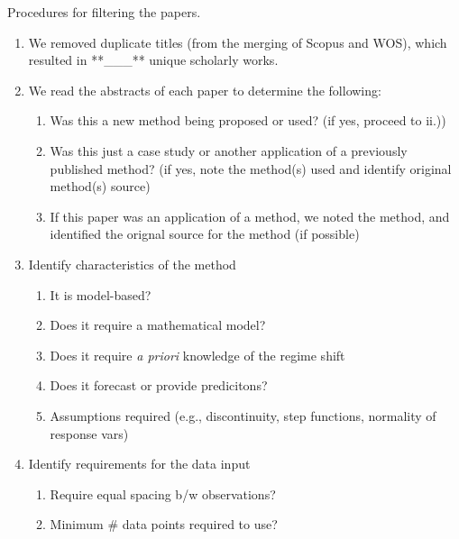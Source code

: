 \documentclass[12pt,twoside]{reedthesis}
\providecommand{\tightlist}{%
  \setlength{\itemsep}{0pt}\setlength{\parskip}{0pt}}
\begin{document}
\begin{enumerate}
  Procedures for filtering the papers.
  \begin{enumerate}
  \def\labelenumii{\roman{enumii}.}
  \tightlist
  \item
    We removed duplicate titles (from the merging of Scopus and WOS),
    which resulted in **\_\_\_** unique scholarly works.\\
  \item
    We read the abstracts of each paper to determine the following:
    \begin{enumerate}
    \def\labelenumiii{\alph{enumiii}.}
    \tightlist
    \item
      Was this a new method being proposed or used? (if yes, proceed to
      ii.))\\
    \item
      Was this just a case study or another application of a previously
      published method? (if yes, note the method(s) used and identify
      original method(s) source)\\
    \item
      If this paper was an application of a method, we noted the method,
      and identified the orignal source for the method (if possible)\\
    \end{enumerate}
  \item
    Identify characteristics of the method
    \begin{enumerate}
    \def\labelenumiii{\alph{enumiii}.}
    \setcounter{enumiii}{2}
    \tightlist
    \item
      It is model-based?\\
    \item
      Does it require a mathematical model?
    \item
      Does it require \emph{a priori} knowledge of the regime shift
    \item
      Does it forecast or provide predicitons?
    \item
      Assumptions required (e.g., discontinuity, step functions,
      normality of response vars)
    \end{enumerate}
  \item
    Identify requirements for the data input
    \begin{enumerate}
    \def\labelenumiii{\alph{enumiii}.}
    \tightlist
    \item
      Require equal spacing b/w observations?
    \item
      Minimum \# data points required to use?

\end{enumerate}
\end{enumerate}
\end{enumerate}
\end{document}
